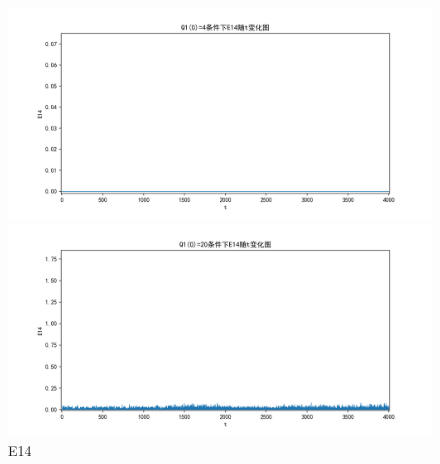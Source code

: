 \documentclass[10pt, a4paper]{article}
\begin{document}
    \begin{figure}[H]
        \begin{minipage}[t]{0.49\textwidth}
            \centering
            \includegraphics[width=\textwidth]{./q5_pics/cmp/E14.png}
        \end{minipage}
        \begin{minipage}[t]{0.49\textwidth}
            \centering
            \includegraphics[width=\textwidth]{./q5_pics/exp/E14.png}
        \end{minipage}
        \caption{E14}\label{fig:E14 in q5}
    \end{figure}
\end{document}
